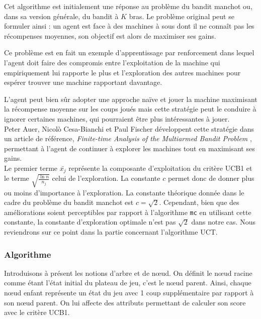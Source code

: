 \documentclass[a4paper]{article}
\theoremstyle{definition}
\begin{document}
Cet algorithme est initialement une réponse au problème du bandit manchot ou, dans sa version générale, du bandit à $K$ bras. Le problème original peut se formuler ainsi : un agent est face à des machines à sous dont il ne connaît pas les récompenses moyennes, son objectif est alors de maximiser ses gains.

Ce problème est en fait un exemple d'apprentissage par renforcement dans lequel l'agent doit faire des compromis entre l'exploitation de la machine qui empiriquement lui rapporte le plus et l'exploration des autres machines pour espérer trouver une machine rapportant davantage.

L'agent peut bien sûr adopter une approche naïve et jouer la machine maximisant la récompense moyenne sur les coups joués mais  cette stratégie peut le conduire à ignorer certaines machines, qui pourraient être plus intéressantes à jouer. \\

Peter Auer, Nicol\`o Cesa-Bianchi et Paul Fischer développent cette stratégie dans un article de référence, \textit{Finite-time Analysis of the Multiarmed Bandit Problem} \cite{ref1}, permettant à l'agent de continuer à explorer les machines tout en maximisant ses gains.\\

Le premier terme $\bar{x_j}$ représente la composante d'exploitation du critère UCB1 et le terme $\sqrt{\frac{\ln{n}}{n_j} }$ celui de l'exploration. La constante $c$ permet donc de donner plus ou moins d'importance à l'exploration. La constante théorique donnée dans le cadre du problème du bandit manchot est $c=\sqrt{2}$. Cependant, bien que des améliorations soient perceptibles par rapport à l'algorithme \texttt{mc} en utilisant cette constante, la constante d'exploration optimale n'est pas $\sqrt{2}$ dans notre cas. Nous reviendrons sur ce point dans la partie concernant l'algorithme UCT. \\

\newpage

\subsubsection{Algorithme}

Introduisons à présent les notions d'arbre et de nœud. On définit le nœud racine comme étant l'état initial du plateau de jeu, c'est le nœud parent. Ainsi, chaque nœud enfant représente un état du jeu avec 1 coup supplémentaire par rapport à son nœud parent. On lui affecte des attributs permettant de calculer son score avec le critère UCB1.
\end{document}
